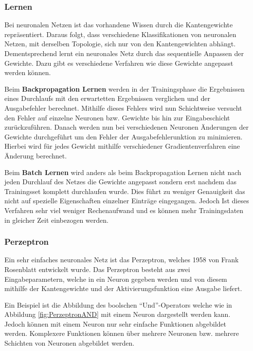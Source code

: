     \subsubsection{Lernen}
    Bei neuronalen Netzen ist das vorhandene Wissen durch die Kantengewichte repräsentiert.
    Daraus folgt, dass verschiedene Klassifikationen von neuronalen Netzen, mit derselben Topologie, sich nur von den Kantengewichten abhängt.
    Dementsprechend lernt ein neuronales Netz durch das sequentielle Anpassen der Gewichte.
    Dazu gibt es verschiedene Verfahren wie diese Gewichte angepasst werden können.
    \newline

    \noindent
    Beim \textbf{Backpropagation Lernen} werden in der Trainingsphase die Ergebnissen eines Durchlaufs mit den erwartetten Ergebnissen verglichen und der Ausgabefehler berechnet.
    Mithilfe dieses Fehlers wird nun Schichtweise versucht den Fehler auf einzelne Neuronen bzw. Gewichte bis hin zur Eingabeschicht zurückzuführen.
    Danach werden nun bei verschiedenen Neuronen Änderungen der Gewichte durchgeführt um den Fehler der Ausgabefehlerunktion zu minimieren.
    Hierbei wird für jedes Gewicht mithilfe verschiedener Gradientenverfahren eine Änderung berechnet.
    \newline

    \noindent
    Beim \textbf{Batch Lernen} wird anders als beim Backpropagation Lernen nicht nach jeden Durchlauf des Netzes die Gewichte angepasst sondern erst nachdem das Trainingsset komplett durchlaufen wurde.
    Dies führt zu weniger Genauigkeit das nicht auf spezielle Eigenschaften einzelner Einträge eingegangen.
    Jedoch Ist dieses Verfahren sehr viel weniger Rechenaufwand und es können mehr Trainingsdaten in gleicher Zeit einbezogen werden.
    
    \subsubsection{Perzeptron}
    Ein sehr einfaches neuronales Netz ist das Perzeptron, welches 1958 von Frank Rosenblatt entwickelt wurde.
    Das Perzeptron besteht aus zwei Eingabeparametern, welche in ein Neuron gegeben werden und von diesem mithilfe der Kantengewichte und der Aktivierungsfunktion eine Ausgabe liefert.

    Ein Beispiel ist die Abbildung des boolschen "`Und"'-Operators welche wie in Abbildung \ref{fig:PerzeptronAND} mit einem Neuron dargestellt werden kann.
    Jedoch können mit einem Neuron nur sehr einfache Funktionen abgebildet werden. 
    Komplexere Funktionen können über mehrere Neuronen bzw. mehrere Schichten von Neuronen abgebildet werden.

